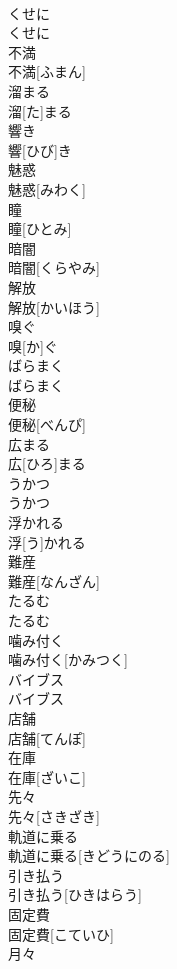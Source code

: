 \documentclass[8pt]{extreport}
\begin{document}
\begin{CJK}{UTF8}{min}
\\	くせに	
\\	くせに	
\\	不満	
\\	不満[ふまん]	
\\	溜まる	
\\	溜[た]まる	
\\	響き	
\\	響[ひび]き	
\\	魅惑	
\\	魅惑[みわく]	
\\	瞳	
\\	瞳[ひとみ]	
\\	暗闇	
\\	暗闇[くらやみ]	
\\	解放	
\\	解放[かいほう]	
\\	嗅ぐ	
\\	嗅[か]ぐ	
\\	ばらまく	
\\	ばらまく	
\\	便秘	
\\	便秘[べんぴ]	
\\	広まる	
\\	広[ひろ]まる	
\\	うかつ	
\\	うかつ	
\\	浮かれる	
\\	浮[う]かれる	
\\	難産	
\\	難産[なんざん]	
\\	たるむ	
\\	たるむ	
\\	噛み付く	
\\	噛み付く[かみつく]	
\\	バイブス	
\\	バイブス	
\\	店舗	
\\	店舗[てんぽ]	
\\	在庫	
\\	在庫[ざいこ]	
\\	先々	
\\	先々[さきざき]	
\\	軌道に乗る	
\\	軌道に乗る[きどうにのる]	
\\	引き払う	
\\	引き払う[ひきはらう]	
\\	固定費	
\\	固定費[こていひ]	
\\	月々	

\end{CJK}
\end{document}
